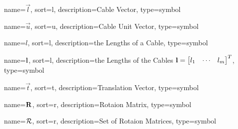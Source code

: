 	{%
		name=\ensuremath{\vec{l}},
		sort=l,
		description=Cable Vector,
		type=symbol
	}
	\newcommand{\cablevec}{\gls{sym:cablevec}}

	{%
		name=\ensuremath{\vec{u}},
		sort=u,
		description=Cable Unit Vector,
		type=symbol
	}
	\newcommand{\cableuvec}{\gls{sym:cableuvec}}

	{%
		name=\ensuremath{l},
		sort=l,
		description=the Lengths of a Cable,
		type=symbol
	}
	\newcommand{\cablelength}{\gls{sym:cablelength}}

	{%
		name=\ensuremath{\mat{l}},
		sort=l,
		description=the Lengths of the Cables \ensuremath{\mat{l} = {\left[\begin{matrix}l_1 & \cdots & l_m \end{matrix}\right]}^T},
		type=symbol
	}
	\newcommand{\cablelengths}{\gls{sym:cablelengths}}

	{%
		name=\ensuremath{\vec{t}},
		sort=t,
		description=Translation Vector,
		type=symbol
	}
	\newcommand{\transvec}{\gls{sym:transvec}}

	{%
		name=\ensuremath{\mat{R}},
		sort=r,
		description=Rotaion Matrix,
		type=symbol
	}
	\newcommand{\rotmatbare}{\gls{sym:rotmat}}
	\newcommand{\rotmat}[2]{{\project{\rotmatbare}{#1}}_{#2}}

	{%
		name=\ensuremath{\set{R}},
		sort=r,
		description=Set of Rotaion Matrices,
		type=symbol
}
\newcommand{\setofrotationmatrices}{\gls{sym:setofrotationmatrices}}

